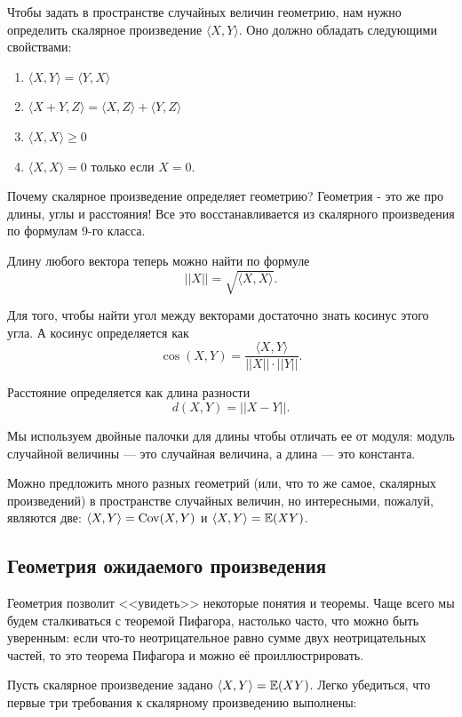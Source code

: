 \documentclass[12pt, a4paper, oneside]{article}
\begin{document}
Чтобы задать в пространстве случайных величин геометрию, нам нужно определить скалярное произведение $\langle X,Y \rangle.$ Оно должно обладать следующими свойствами: 

\begin{enumerate} 
\item $\langle X,Y \rangle= \langle Y,X \rangle$
\item $\langle X+Y,Z \rangle = \langle X,Z \rangle + \langle Y,Z \rangle$
\item $\langle X,X \rangle \ge 0$
\item $\langle X,X \rangle=0$ только если $X=0$.
\end{enumerate} 

Почему скалярное произведение определяет геометрию? Геометрия - это же про длины, углы и расстояния! Все это восстанавливается из скалярного произведения по формулам 9-го класса.

Длину любого вектора теперь можно найти по формуле $$||X|| = \sqrt{\langle X,X \rangle}.$$

Для того, чтобы найти угол между векторами достаточно знать косинус этого угла. А косинус определяется как $$\cos(X,Y) = \frac{\langle X,Y \rangle}{||X|| \cdot ||Y||}.$$ 

Расстояние определяется как длина разности $$d(X,Y)=||X-Y||.$$

Мы используем двойные палочки для длины чтобы отличать ее от модуля: модуль случайной величины --- это случайная величина, а длина --- это константа.

Можно предложить много разных геометрий (или, что то же самое, скалярных произведений) в пространстве случайных величин, но интересными, пожалуй, являются две: $\langle X,Y \rangle = \operatorname{Cov}(X,Y)$ и $\langle X,Y \rangle = \mathbb{E}(XY)$. 

\subsection{Геометрия ожидаемого произведения}

Геометрия позволит <<увидеть>> некоторые понятия и теоремы. Чаще всего мы будем сталкиваться с теоремой Пифагора, настолько часто, что можно быть уверенным: если что-то неотрицательное равно сумме двух неотрицательных частей, то это теорема Пифагора и можно её проиллюстрировать.

Пусть скалярное произведение задано $\langle X,Y \rangle=\mathbb{E}(XY)$. Легко убедиться, что первые три требования к скалярному произведению выполнены:
\end{document}
